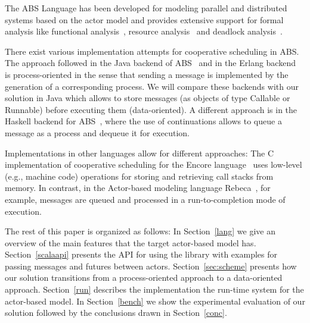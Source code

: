 The ABS Language has been developed for modeling parallel and distributed systems based on the actor model and provides extensive support for formal analysis like functional analysis~\cite{KeY}, resource analysis~\cite{saco} and deadlock analysis~\cite{dead}. 


There exist various implementation attempts for cooperative scheduling in ABS. 
The approach followed in the Java backend of ABS~\cite{abs,Schafer} and in the Erlang backend~\cite{Erlang} is process-oriented in the sense that sending a message is implemented by the generation of a corresponding process. We will compare these backends with our solution in Java which allows to store messages (as objects of type Callable or Runnable) before executing them (data-oriented). A different approach is in the Haskell backend for ABS~\cite{Haskell}, where the use of continuations allows
to queue a message as a process and dequeue it for execution.


Implementations in other languages allow for different approaches:
The C implementation of cooperative scheduling for the
Encore language~\cite{Encore} uses low-level (e.g., machine code) operations for
storing and retrieving call stacks from memory. In contrast, in the Actor-based modeling language Rebeca~\cite{Sirjani}, for example,
messages are queued and processed in a run-to-completion mode of execution.

The rest of this paper is organized as follows: In Section~\ref{lang} we give an overview of the main features that the target actor-based model has. Section~\ref{scalaapi} presents the API for using the library with examples for passing messages and futures between actors. Section~\ref{sec:scheme} presents how our solution transitions from a process-oriented approach to a data-oriented approach. Section~\ref{run} describes the implementation the run-time system for the actor-based model. In Section~\ref{bench} we show the experimental evaluation of our solution followed by the conclusions drawn in Section~\ref{conc}.
